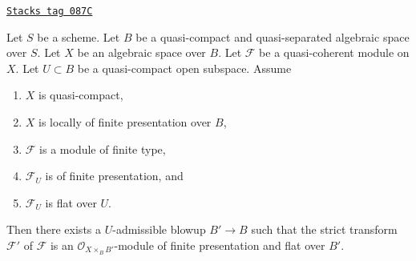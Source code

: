 \begin{theorem}
\label{spaces-more-morphisms-theorem-flatten-module}
\href{https://stacks.math.columbia.edu/tag/087C}{\texttt{Stacks tag 087C}}

Let $S$ be a scheme. Let $B$ be a quasi-compact and quasi-separated
algebraic space over $S$. Let $X$ be an algebraic space over $B$.
Let $\mathcal{F}$ be a quasi-coherent module on $X$.
Let $U \subset B$ be a quasi-compact open subspace. Assume
\begin{enumerate}
\item $X$ is quasi-compact,
\item $X$ is locally of finite presentation over $B$,
\item $\mathcal{F}$ is a module of finite type,
\item $\mathcal{F}_U$ is of finite presentation, and
\item $\mathcal{F}_U$ is flat over $U$.
\end{enumerate}
Then there exists a $U$-admissible blowup $B' \to B$ such that the
strict transform $\mathcal{F}'$ of $\mathcal{F}$ is an
$\mathcal{O}_{X \times_B B'}$-module of finite presentation and
flat over $B'$.
\end{theorem}

